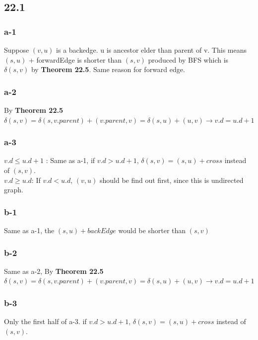 \documentclass[]{article}
\begin{document}
\subsection{22.1}
\subsubsection{a-1}

Suppose $(v,u)$ is a backedge. u is ancestor elder than parent of v. This means $(s,u)$ + forwardEdge is shorter than $(s,v)$ produced by BFS which is $\delta(s,v)$ by \textbf{Theorem 22.5}. Same reason for forward edge.   

\subsubsection{a-2}

By \textbf{Theorem 22.5} $\delta(s,v) = \delta(s,v.parent) + (v.parent, v) = \delta(s,u) + (u,v) \rightarrow v.d = u.d + 1$

\subsubsection{a-3}

$v.d \le u.d + 1$ : Same as a-1, if $v.d > u.d + 1$, $\delta(s,v) = (s,u) + cross$ instead of $(s,v)$. \\
$v.d \ge u.d$: If $v.d < u.d$, $(v,u)$ should be find out first, since this is undirected graph. 

\subsubsection{b-1}

Same as a-1, the $(s, u) + backEdge$ would be shorter than $(s, v)$

\subsubsection{b-2}

Same as a-2, By \textbf{Theorem 22.5} $\delta(s,v) = \delta(s,v.parent) + (v.parent, v) = \delta(s,u) + (u,v) \rightarrow v.d = u.d + 1$

\subsubsection{b-3}

Only the first half of a-3. if $v.d > u.d + 1$, $\delta(s,v) = (s,u) + cross$ instead of $(s,v)$. 
\end{document}
